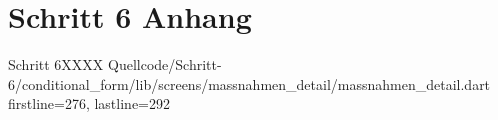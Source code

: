 \chapter{Schritt 6 Anhang} 
\label{appendix:Schritt6Anhang}

\begin{alexlisting}{Schritt 6}{XXXX}
    {Quellcode/Schritt-6/conditional_form/lib/screens/massnahmen_detail/massnahmen_detail.dart}
    {firstline=276, lastline=292}
    \label{lst:Schritt6validateChoices}
  \end{alexlisting}
